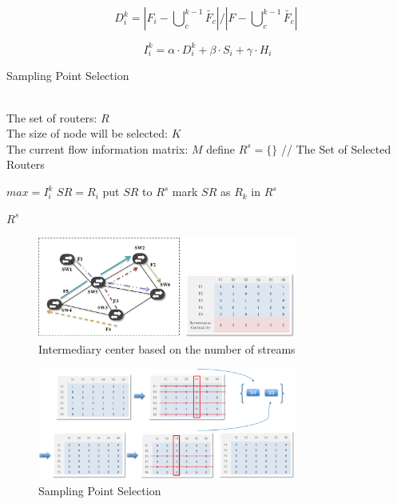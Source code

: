 \documentclass[conference,compsoc]{IEEEtran}
\begin{document}
\begin{equation}
D_{i}^{k}={\left| {{F}_{i}}-\bigcup\nolimits_{c}^{k-1}{\widetilde{{{F}_{c}}}} \right|}/{\left| F-\bigcup\nolimits_{c}^{k-1}{\widetilde{{{F}_{c}}}} \right|}\;
\end{equation}
 

\begin{equation}
I_{i}^{k}=\alpha \cdot D_{i}^{k}+\beta \cdot {{S}_{i}}+\gamma \cdot {{H}_{i}}
\end{equation}

\begin{algorithm}[h]
\caption{Sampling Point Selection}
\begin{algorithmic}[1]
\REQUIRE ~~\\ The set of routers: $ R$ \\  The size of node will be selected: $K$ \\ The current flow information matrix: $M$
\STATE define $R^s=\{\}$  //  The Set of Selected Routers


\STATE $max = I_i^k$
\STATE $SR = R_i$
\ENDIF
\ENDFOR
\STATE put $SR$ to $R^s$
\STATE mark $SR$ as $R_k$ in $R^s$
\ENDFOR

\RETURN $R^s$
\label{code:recentEnd}
\end{algorithmic}
\end{algorithm}



\begin{figure}[!hhhhhhhhhht]
\centering
\includegraphics[width=8.5cm]{images/png_sampling_point.png}
\caption{Intermediary center based on the number of streams}
\label{png_sampling_point.png}
\end{figure}

\begin{figure}[!hhhhhhhhhht]
\centering
\includegraphics[width=8.5cm]{images/png_sampling_point_in.png}
\caption{Sampling Point Selection}
\label{png_sampling_point_in.png}
\end{figure}
\end{document}
